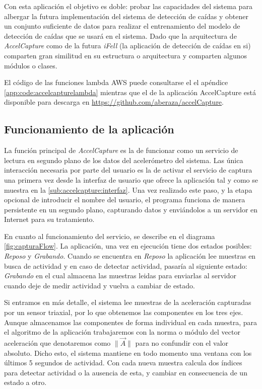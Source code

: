 Con esta aplicación el objetivo es doble: probar las capacidades del sistema para albergar la futura implementación del sistema de detección de caídas y obtener un conjunto suficiente de datos para realizar el entrenamiento del modelo de detección de caídas que se usará en el sistema. Dado que la arquitectura de \textit{AccelCapture} como de la futura \textit{iFell} (la aplicación de detección de caídas en si) comparten gran similitud en su estructura o arquitectura y comparten algunos módulos o clases.

El código de las funciones lambda AWS puede consultarse el el apéndice \ref{app:code:accelcapturelambda} mientras que el de la aplicación AccelCapture está disponible para descarga en \url{https://github.com/aberaza/accelCapture}.

\subsection{Funcionamiento de la aplicación}\label{sub:accelcapture:flujo}

La función principal de \textit{AccelCapture} es la de funcionar como un servicio de lectura en segundo plano de los datos del acelerómetro del sistema. Las única interacción necesaria por parte del usuario es la de activar el servicio de captura una primera vez desde la interfaz de usuario que ofrece la aplicación tal y como se muestra en la \autoref{sub:accelcapture:interfaz}. Una vez realizado este paso, y la etapa opcional de introducir el nombre del usuario, el programa funciona de manera persistente en un segundo plano, capturando datos y enviándolos a un servidor en Internet para su tratamiento.

En cuanto al funcionamiento del servicio, se describe en el diagrama \ref{fig:capturaFlow}. La aplicación, una vez en ejecución tiene dos estados posibles: \textit{Reposo} y \textit{Grabando}. Cuando se encuentra en \textit{Reposo} la aplicación lee muestras en busca de actividad y en caso de detectar actividad, pasaría al siguiente estado: \textit{Grabando} en el cual almacena las muestras leidas para enviarlas al servidor cuando deje de medir actividad y vuelva a cambiar de estado. 


Si entramos en más detalle, el sistema lee muestras de la aceleración capturadas por un sensor triaxial, por lo que obtenemos las componentes en los tres ejes. Aunque almacenamos las componentes de forma individual en cada muestra, para el algoritmo de la aplicación trabajaremos con la norma o módulo del vector aceleración que denotaremos como $\|\vec{A}\|$ para no confundir con el valor absoluto. Dicho esto, el sistema mantiene en todo momento una ventana con los últimos 5 segundos de actividad. Con cada nueva muestra calcula dos índices para detectar actividad o la ausencia de esta, y cambiar en consecuencia de un estado a otro. 

